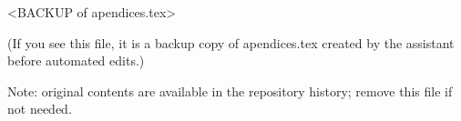 <BACKUP of apendices.tex>

(If you see this file, it is a backup copy of apendices.tex created by the assistant before automated edits.)

Note: original contents are available in the repository history; remove this file if not needed.
